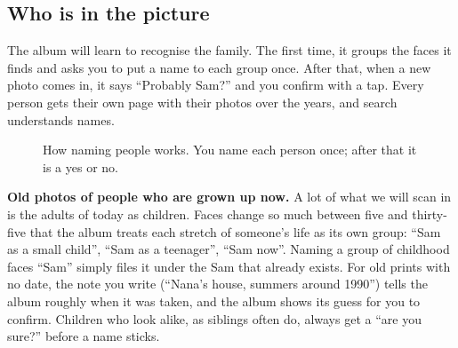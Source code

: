 \documentclass[11pt,a4paper]{article}
\begin{document}
\subsection{Who is in the picture}

The album will learn to recognise the family. The first time, it groups the faces it finds and asks you to put a name to each group once. After that, when a new photo comes in, it says ``Probably Sam?'' and you confirm with a tap. Every person gets their own page with their photos over the years, and search understands names.

\begin{figure}[H]
  \centering
  \caption{How naming people works. You name each person once; after that it is a yes or no.}
\end{figure}

\textbf{Old photos of people who are grown up now.} A lot of what we will scan in is the adults of today as children. Faces change so much between five and thirty-five that the album treats each stretch of someone's life as its own group: ``Sam as a small child'', ``Sam as a teenager'', ``Sam now''. Naming a group of childhood faces ``Sam'' simply files it under the Sam that already exists. For old prints with no date, the note you write (``Nana's house, summers around 1990'') tells the album roughly when it was taken, and the album shows its guess for you to confirm. Children who look alike, as siblings often do, always get a ``are you sure?'' before a name sticks.
\end{document}
